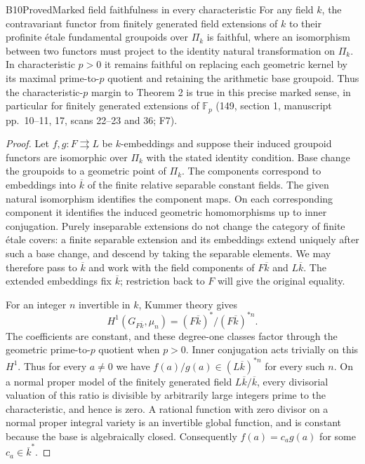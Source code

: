 \begin{result}{B10}{Proved}{Marked field faithfulness in every characteristic}
\label{res:B10}
For any field $k$, the contravariant functor from finitely generated
field extensions of $k$ to their profinite \'etale fundamental groupoids
over $\Pi_k$ is faithful, where an isomorphism between two functors
must project to the identity natural transformation on $\Pi_k$.
In characteristic $p>0$ it remains faithful on replacing each geometric
kernel by its maximal prime-to-$p$ quotient and retaining the arithmetic
base groupoid. Thus the characteristic-$p$ margin to Theorem 2 is true
in this precise marked sense, in particular for finitely generated
extensions of $\mathbb F_p$ (149, section 1, manuscript pp.~10--11,
17, scans 22--23 and 36; F7).
\end{result}
\begin{proof}
Let $f,g:F\rightrightarrows L$ be $k$-embeddings and suppose their
induced groupoid functors are isomorphic over $\Pi_k$ with the stated
identity condition. Base change the groupoids to a geometric point of
$\Pi_k$. The components correspond to embeddings into $\overline k$
of the finite relative separable constant fields. The given natural
isomorphism identifies the component maps. On each corresponding
component it identifies the induced geometric homomorphisms up to
inner conjugation. Purely inseparable extensions do not change the
category of finite \'etale covers: a finite separable extension and
its embeddings extend uniquely after such a base change, and descend
by taking the separable elements. We may therefore pass to
$\overline k$ and work with the field components of $F\overline k$
and $L\overline k$. The extended embeddings fix $\overline k$;
restriction back to $F$ will give the original equality.

For an integer $n$ invertible in $k$, Kummer theory gives
\[
 H^1(G_{F\overline k},\mu_n)
       =(F\overline k)^*/(F\overline k)^{*n}.
\]
The coefficients are constant, and these degree-one classes factor
through the geometric prime-to-$p$ quotient when $p>0$. Inner
conjugation acts trivially on this $H^1$. Thus for every $a\ne0$
we have $f(a)/g(a)\in(L\overline k)^{*n}$ for every such $n$.
On a normal proper model of the finitely generated field
$L\overline k/\overline k$, every divisorial valuation of this ratio
is divisible by arbitrarily large integers prime to the characteristic,
and hence is zero. A rational function with zero divisor on a normal
proper integral variety is an invertible global function, and is
constant because the base is algebraically closed. Consequently
$f(a)=c_a g(a)$ for some $c_a\in\overline k^*$.


\end{proof}
